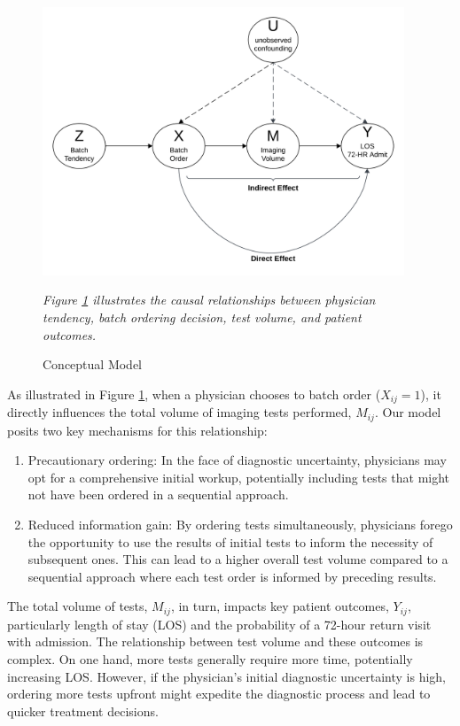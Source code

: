 \documentclass{article}
\begin{document}
\begin{figure}[h]
  \centering
  \caption{Conceptual Model}
  \label{fig:dag}
  \includegraphics[width=4.25in]{model.png}
  \begin{tablenotes}
    \small
    \item \textit{Figure \ref{fig:dag} illustrates the causal relationships between physician tendency, batch ordering decision, test volume, and patient outcomes.}
  \end{tablenotes}
\end{figure}

As illustrated in Figure \ref{fig:dag}, when a physician chooses to
batch order (\(X_{ij} = 1\)), it directly influences the total volume of
imaging tests performed, \(M_{ij}\). Our model posits two key mechanisms
for this relationship:

\begin{enumerate}
  \item Precautionary ordering: In the face of diagnostic uncertainty, physicians may opt for a comprehensive initial workup, potentially including tests that might not have been ordered in a sequential approach.
  \item Reduced information gain: By ordering tests simultaneously, physicians forego the opportunity to use the results of initial tests to inform the necessity of subsequent ones. This can lead to a higher overall test volume compared to a sequential approach where each test order is informed by preceding results.
\end{enumerate}

The total volume of tests, \(M_{ij}\), in turn, impacts key patient
outcomes, \(Y_{ij}\), particularly length of stay (LOS) and the
probability of a 72-hour return visit with admission. The relationship
between test volume and these outcomes is complex. On one hand, more
tests generally require more time, potentially increasing LOS. However,
if the physician's initial diagnostic uncertainty is high, ordering more
tests upfront might expedite the diagnostic process and lead to quicker
treatment decisions.
\end{document}
